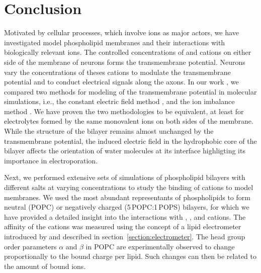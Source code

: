 \chapter*{Conclusion}

Motivated by cellular processes, 
which involve ions as major actors, 
we have investigated model phospholipid membranes and their interactions 
with biologically relevant ions. 
The controlled concentrations of  and  cations 
on either side of the membrane of neurons
forms the transmembrane potential. 
Neurons vary the concentrations of theses cations
to modulate the transmembrane potential 
and to conduct electrical signals along the axons. \citep{Knudsen_book2002, Storace2015, Sung2015}
In our work \citep{melcr16},
we compared two methods for modeling of the transmembrane potential in molecular simulations, 
i.e., 
the constant electric field method \cite{Roux1997,Roux2008, gumbart_constant_2012}, 
and the ion imbalance method \cite{sachs04_potential, kutzner_computational_2011}. 
We have proven the two methodologies to be equivalent, 
at least for electrolytes formed by the same monovalent ions on both sides of the membrane. 
While
the structure of the bilayer remains almost unchanged by the transmembrane potential, 
the induced electric field in the hydrophobic core of the bilayer
affects the orientation of water molecules at its interface 
highligting its importance in electroporation. \citep{bu2017mechanics}


Next,
we performed extensive sets of simulations of phospholipid bilayers
with different salts at varying concentrations
to study the binding of cations to model membranes. 
We used the most abundant representants of phospholipids
to form neutral (POPC) or negatively charged (5\,POPC:1\,POPS) bilayers, 
for which we have provided a detailed insight 
into the interactions with 
, , and  cations. 
The affinity of the cations 
was measured using the concept of a lipid electrometer 
introduced by \citet{seelig87} 
and described in section~\ref{section:electrometer}.
The head group order parameters $\alpha$ and $\beta$ in POPC
are experimentally observed to change
proportionally to the bound charge per lipid. 
Such changes can then be related to the amount of bound ions.

